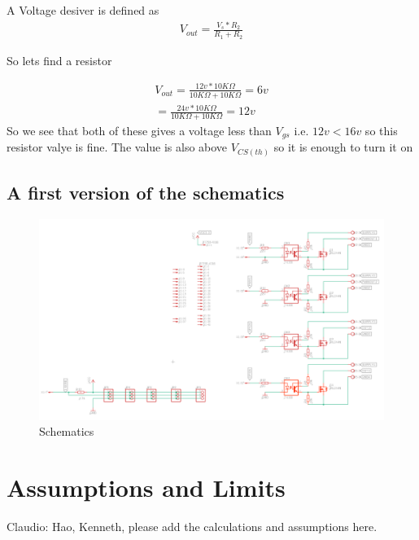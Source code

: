 \documentclass{article}
\begin{document}
A Voltage desiver is defined as
 \begin{equation}
 \begin{multlined}
V_{out} = \frac{V_s * R_2}{R_1+R_2}
\end{multlined}
\end{equation}

So lets find a resistor

 \begin{equation}
 \begin{multlined}
V_{out} = \frac{12v * 10K\Omega}{10K\Omega+10K\Omega} = 6v \\
 = \frac{24v * 10K\Omega}{10K\Omega+10K\Omega} = 12v 
\end{multlined}
\end{equation}
So we see that both of these gives a voltage less than $V_{gs}$ i.e. $12v < 16v$ so this resistor valye is fine. The value is also above $V_{CS(th)}$ so it is enough to turn it on


\subsection{A first version of the schematics}

\begin{figure}[!hpt]
\includegraphics[scale=0.2]{schematics.png}

\caption{Schematics}
\label{fig:schematics}
\end{figure}


\section{Assumptions and Limits}

Claudio: Hao, Kenneth, please add the calculations and assumptions here.
\end{document}
